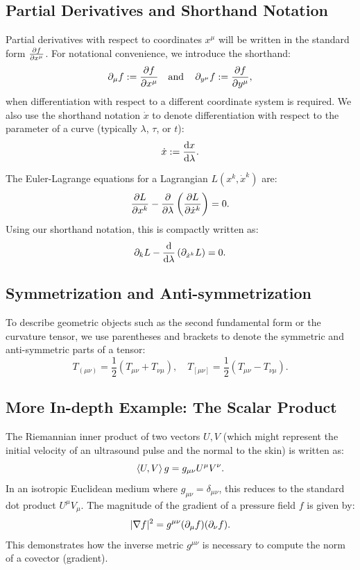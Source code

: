 \subsection{Partial Derivatives and Shorthand Notation} Partial derivatives with respect to coordinates $x^\mu$ will be written in the standard form $\pdv{f}{x^\mu}$. For notational convenience, we introduce the shorthand:
\[%
  \pd{\mu} f := \pdv{f}{x^\mu} \aand \pd{y^\mu} f := \pdv{f}{y^\mu}
,\]%
when differentiation with respect to a different coordinate system is required. We also use the shorthand notation $\dot{x}$ to denote differentiation with respect to the parameter of a curve (typically $\lambda$, $\tau$, or $t$):
\[%
  \dot{x} := \odv{x}{\lambda}
.\]%

\begin{example}
  The Euler-Lagrange equations for a Lagrangian $L(x^k, \dot{x}^k)$ are:
  \[%
    \pdv{L}{x^k} - \pdv{}{\lambda} \left(\pdv{L}{\dot{x}^k}\right) = 0
  .\]%
  Using our shorthand notation, this is compactly written as:
  \[%
    \pd{k} L - \odv{}{\lambda} \left(\pd{\dot{x}^k} L\right) = 0
  .\]%
\end{example}

\subsection{Symmetrization and Anti-symmetrization} To describe geometric objects such as the second fundamental form or the curvature tensor, we use parentheses and brackets to denote the symmetric and anti-symmetric parts of a tensor:
\[%
  T_{(\mu\nu)} = \frac{1}{2}(T_{\mu\nu} + T_{\nu\mu}), \quad T_{[\mu\nu]} = \frac{1}{2}(T_{\mu\nu} - T_{\nu\mu})
.\]%

\subsection{More In-depth Example: The Scalar Product} The Riemannian inner product of two vectors $U, V$ (which might represent the initial velocity of an ultrasound pulse and the normal to the skin) is written as:
\[%
  \braket{U, V}g = g_{\mu\nu} U^\mu V^\nu
.\]%
In an isotropic Euclidean medium where $g_{\mu\nu} = \delta_{\mu\nu}$, this reduces to the standard dot product $U^\mu V_\mu$. The magnitude of the gradient of a pressure field $f$ is given by:
\[%
  |\nabla f|^2 = g^{\mu\nu} (\pd{\mu} f) (\pd{\nu} f)
.\]%
This demonstrates how the inverse metric $g^{\mu\nu}$ is necessary to compute the norm of a covector (gradient).
